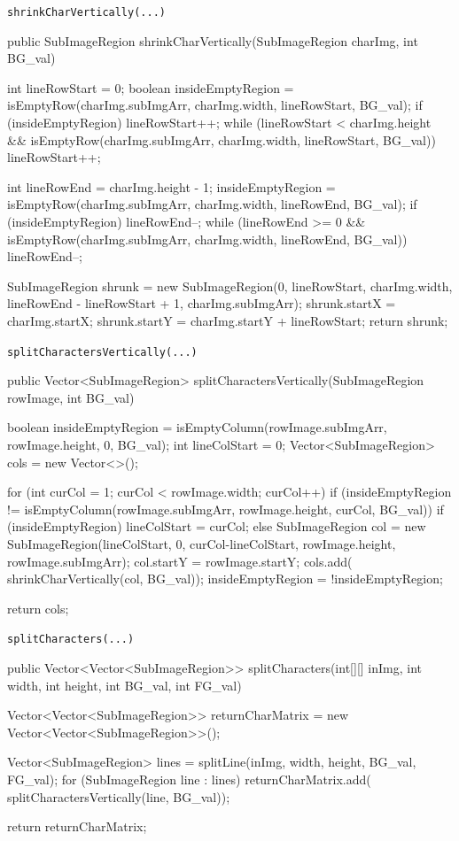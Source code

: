 \documentclass[german,notitlepage,smartquotes]{hgbreport}
\begin{document}
\begin{program}[h]
\caption{\texttt{shrinkCharVertically(...)}}
\label{prog:extract-02}
\begin{JavaCode}
public SubImageRegion shrinkCharVertically(SubImageRegion charImg, int BG_val) {
	int lineRowStart = 0;
	boolean insideEmptyRegion = isEmptyRow(charImg.subImgArr, charImg.width, lineRowStart, BG_val);
	if (insideEmptyRegion) {
		lineRowStart++;
		while (lineRowStart < charImg.height && isEmptyRow(charImg.subImgArr, charImg.width, lineRowStart, BG_val)) {
			lineRowStart++;
		}
	}

	int lineRowEnd = charImg.height - 1;
	insideEmptyRegion = isEmptyRow(charImg.subImgArr, charImg.width, lineRowEnd, BG_val);
	if (insideEmptyRegion) {
		lineRowEnd--;
		while (lineRowEnd >= 0 && isEmptyRow(charImg.subImgArr, charImg.width, lineRowEnd, BG_val)) {
			lineRowEnd--;
		}
	}

	SubImageRegion shrunk = new SubImageRegion(0, lineRowStart, charImg.width, lineRowEnd - lineRowStart + 1, charImg.subImgArr);
	shrunk.startX = charImg.startX;
	shrunk.startY = charImg.startY + lineRowStart;
	return shrunk;
}
\end{JavaCode}
\end{program}

\begin{program}[h]
\caption{\texttt{splitCharactersVertically(...)}}
\label{prog:extract-03}
\begin{JavaCode}
public Vector<SubImageRegion> splitCharactersVertically(SubImageRegion rowImage, int BG_val) {
	boolean insideEmptyRegion = isEmptyColumn(rowImage.subImgArr, rowImage.height, 0, BG_val);
	int lineColStart = 0;
	Vector<SubImageRegion> cols = new Vector<>();

	for (int curCol = 1; curCol < rowImage.width; curCol++) {
		if (insideEmptyRegion != isEmptyColumn(rowImage.subImgArr, rowImage.height, curCol, BG_val)) {
			if (insideEmptyRegion) {
				lineColStart = curCol;
			} else{
				SubImageRegion col = new SubImageRegion(lineColStart, 0, curCol-lineColStart, rowImage.height, rowImage.subImgArr);
				col.startY = rowImage.startY;
				cols.add(
						shrinkCharVertically(col, BG_val));
			}
			insideEmptyRegion = !insideEmptyRegion;
		}
	}

	return cols;
}
\end{JavaCode}
\end{program}

\begin{program}[h]
\caption{\texttt{splitCharacters(...)}}
\label{prog:extract-04}
\begin{JavaCode}
public Vector<Vector<SubImageRegion>> splitCharacters(int[][] inImg, int width, int height, int BG_val, int FG_val) {
	Vector<Vector<SubImageRegion>> returnCharMatrix = new Vector<Vector<SubImageRegion>>();

	Vector<SubImageRegion> lines = splitLine(inImg, width, height, BG_val, FG_val);
	for (SubImageRegion line : lines) {
		returnCharMatrix.add(
				splitCharactersVertically(line, BG_val));
	}

	return returnCharMatrix;
}
\end{JavaCode}
\end{program}
\end{document}
